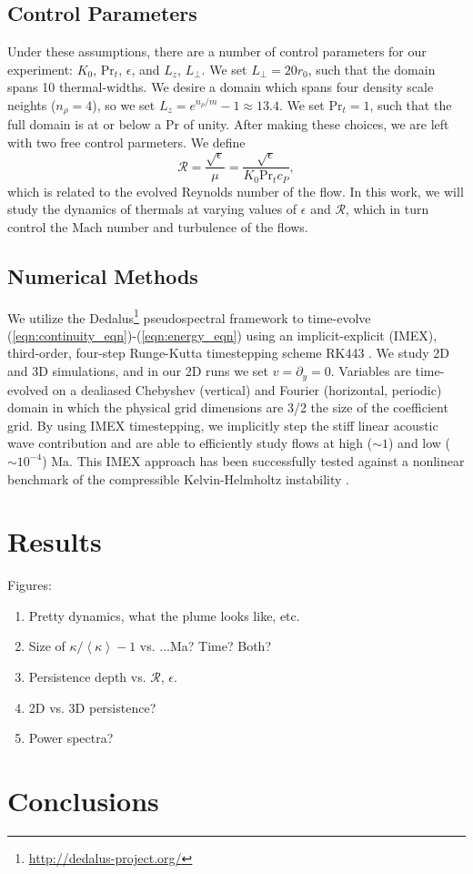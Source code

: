 \documentclass[twocolumn, amsmath, amsfonts, amssymb]{aastex62}
\newcommand{\angles}[1]{\ensuremath{\left\langle #1 \right\rangle}}
\begin{document}
\subsection{Control Parameters}
Under these assumptions, there are a number of control parameters for
our experiment: $K_0$, $\text{Pr}_t$, $\epsilon$, and $L_z$, $L_\perp$.
We set $L_\perp = 20r_0$, such that the domain spans 10 thermal-widths.
We desire a domain which spans four density scale neights ($n_\rho = 4$),
so we set $L_z = e^{n_\rho / m} - 1 \approx 13.4$.  We set $\text{Pr}_t = 1$,
such that the full domain is at or below a Pr of unity. After making these
choices, we are left with two free control parmeters. We define
\begin{equation}
\mathcal{R} =  \frac{\sqrt{\epsilon}}{\mu} = \frac{\sqrt{\epsilon}}{K_0 \text{Pr}_t c_P},
\end{equation}
which is related to the evolved Reynolds number of the flow. In this
work, we will study the dynamics of thermals at varying values of
$\epsilon$ and $\mathcal{R}$, which in turn control the Mach number and
turbulence of the flows.

\subsection{Numerical Methods}
\label{sec:numerics}
We utilize the 
Dedalus\footnote{\url{http://dedalus-project.org/}} 
pseudospectral framework \cite{burns&all2016} to time-evolve  
(\ref{eqn:continuity_eqn})-(\ref{eqn:energy_eqn}) 
using an implicit-explicit (IMEX), third-order, four-step 
Runge-Kutta timestepping scheme RK443 \cite{ascher&all1997}.  
We study 2D and 3D simulations, and in our 2D runs we set $v = \partial_y = 0$.
Variables are time-evolved on a dealiased Chebyshev (vertical)
and Fourier (horizontal, periodic) domain in which the
physical grid dimensions are 3/2 the size of the coefficient grid.  
By using IMEX timestepping, we implicitly step the 
stiff linear acoustic wave contribution and are able to
efficiently study flows at high ($\sim 1$) 
and low ($\sim 10^{-4}$) Ma. This IMEX approach has been successfully 
tested against a nonlinear benchmark  of the compressible 
Kelvin-Helmholtz instability \cite{Lecoanet_et_al_2016_KH}.

\section{Results} \label{sec:results}
Figures:
\begin{enumerate}
\item Pretty dynamics, what the plume looks like, etc.
\item Size of $\kappa/\angles{\kappa} - 1$ vs. ...Ma? Time? Both?
\item Persistence depth vs. $\mathcal{R}$, $\epsilon$.
\item 2D vs. 3D persistence?
\item Power spectra?
\end{enumerate}


\section{Conclusions} \label{sec:conclusions}



\end{document}
